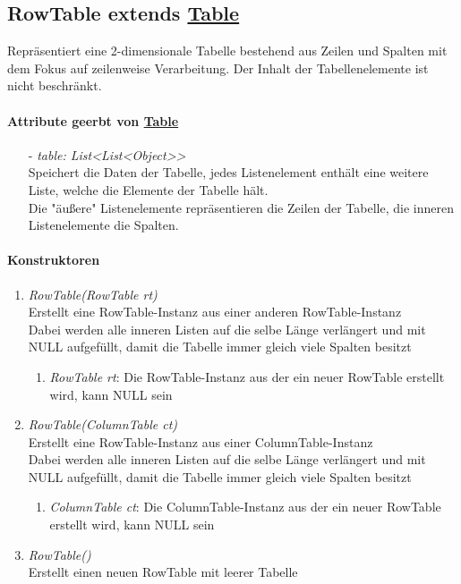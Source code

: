 \subsection*{RowTable extends \hyperref[Table]{Table}}\label{rowtable}
Repräsentiert eine 2-dimensionale Tabelle bestehend aus Zeilen und Spalten mit dem Fokus auf zeilenweise Verarbeitung. Der Inhalt der Tabellenelemente ist nicht beschränkt.
	
	
\paragraph{Attribute geerbt von \hyperref[Table]{Table}}

\begin{itemize}
	\item[-] \textit{table: List{<List<Object>}>} \\
	Speichert die Daten der Tabelle, jedes Listenelement enthält eine weitere Liste, welche die Elemente der Tabelle hält. \\
	Die "äußere" Listenelemente repräsentieren die Zeilen der Tabelle, die inneren Listenelemente die Spalten.
\end{itemize}


\paragraph{Konstruktoren}

\begin{enumerate}[+]
	\item \textit{RowTable(RowTable rt)} \\
	Erstellt eine RowTable-Instanz aus einer anderen RowTable-Instanz \\
	Dabei werden alle inneren Listen auf die selbe Länge verlängert und mit NULL aufgefüllt, damit die Tabelle immer gleich viele Spalten besitzt	
	\begin{enumerate}[$\bullet$]
		\item \textit{RowTable rt}: Die RowTable-Instanz aus der ein neuer RowTable erstellt wird, kann NULL sein
	\end{enumerate}
	\vspace{-0.2cm}
	
	
	\item \textit{RowTable(ColumnTable ct)} \\
	Erstellt eine RowTable-Instanz aus einer ColumnTable-Instanz \\
	Dabei werden alle inneren Listen auf die selbe Länge verlängert und mit NULL aufgefüllt, damit die Tabelle immer gleich viele Spalten besitzt	
	\begin{enumerate}[$\bullet$]
		\item \textit{ColumnTable ct}: Die ColumnTable-Instanz aus der ein neuer RowTable erstellt wird, kann NULL sein
	\end{enumerate}
	\vspace{-0.2cm}
	
	\item \textit{RowTable()} \\
	Erstellt einen neuen RowTable mit leerer Tabelle
\end{enumerate}



